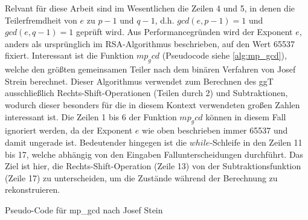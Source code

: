 %

Relvant für diese Arbeit sind im Wesentlichen die Zeilen 4 und 5, in denen die Teilerfremdheit von $e$ zu $p-1$ und $q-1$, d.h. $gcd(e,p-1) = 1$ und $gcd(e,q-1) = 1$ geprüft wird.
Aus Performancegründen wird der Exponent $e$, anders als ursprünglich im RSA-Algorithmus beschrieben, auf den Wert 65537 fixiert.
Interessant ist die Funktion $mp_gcd$ (Pseudocode siehe \ref{alg:mp_gcd}), welche den größten gemeinsamen Teiler nach dem binären Verfahren von Josef Strein \cite{} berechnet. Dieser Algorithmus verwendet zum Berechnen des ggT ausschließlich Rechts-Shift-Operationen (Teilen durch 2) und Subtraktionen, wodurch dieser besonders für die in diesem Kontext verwendeten großen Zahlen interessant ist.
Die Zeilen 1 bis 6 der Funktion $mp_gcd$ können in diesem Fall ignoriert werden, da der Exponent $e$ wie oben beschrieben immer 65537 und damit ungerade ist. Bedeutender hingegen ist die $while$-Schleife in den Zeilen 11 bis 17, welche abhängig von den Eingaben Fallunterscheidungen durchführt. Das Ziel ist hier, die Rechts-Shift-Operation (Zeile 13) von der Subtraktionsfunktion (Zeile 17) zu unterscheiden, um die Zustände während der Berechnung zu rekonstruieren. 

\begin{algorithm}[h]
\DontPrintSemicolon
\caption{Pseudo-Code für mp_gcd nach Josef Stein}
\label{alg:mp_gcd}

\end{algorithm}